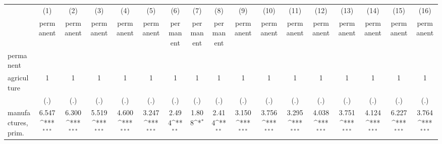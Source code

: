 {
\def\sym#1{\ifmmode^{#1}\else\(^{#1}\)\fi}
\begin{tabular}{l*{16}{c}}
\hline\hline
                    &\multicolumn{1}{c}{(1)}&\multicolumn{1}{c}{(2)}&\multicolumn{1}{c}{(3)}&\multicolumn{1}{c}{(4)}&\multicolumn{1}{c}{(5)}&\multicolumn{1}{c}{(6)}&\multicolumn{1}{c}{(7)}&\multicolumn{1}{c}{(8)}&\multicolumn{1}{c}{(9)}&\multicolumn{1}{c}{(10)}&\multicolumn{1}{c}{(11)}&\multicolumn{1}{c}{(12)}&\multicolumn{1}{c}{(13)}&\multicolumn{1}{c}{(14)}&\multicolumn{1}{c}{(15)}&\multicolumn{1}{c}{(16)}\\
                    &\multicolumn{1}{c}{permanent}&\multicolumn{1}{c}{permanent}&\multicolumn{1}{c}{permanent}&\multicolumn{1}{c}{permanent}&\multicolumn{1}{c}{permanent}&\multicolumn{1}{c}{permanent}&\multicolumn{1}{c}{permanent}&\multicolumn{1}{c}{permanent}&\multicolumn{1}{c}{permanent}&\multicolumn{1}{c}{permanent}&\multicolumn{1}{c}{permanent}&\multicolumn{1}{c}{permanent}&\multicolumn{1}{c}{permanent}&\multicolumn{1}{c}{permanent}&\multicolumn{1}{c}{permanent}&\multicolumn{1}{c}{permanent}\\
\hline
permanent           &                     &                     &                     &                     &                     &                     &                     &                     &                     &                     &                     &                     &                     &                     &                     &                     \\
agriculture         &           1         &           1         &           1         &           1         &           1         &           1         &           1         &           1         &           1         &           1         &           1         &           1         &           1         &           1         &           1         &           1         \\
                    &         (.)         &         (.)         &         (.)         &         (.)         &         (.)         &         (.)         &         (.)         &         (.)         &         (.)         &         (.)         &         (.)         &         (.)         &         (.)         &         (.)         &         (.)         &         (.)         \\
[1em]
manufactures, prim. &       6.547\sym{***}&       6.300\sym{***}&       5.519\sym{***}&       4.600\sym{***}&       3.247\sym{***}&       2.494\sym{**} &       1.808\sym{*}  &       2.414\sym{**} &       3.150\sym{***}&       3.756\sym{***}&       3.295\sym{***}&       4.038\sym{***}&       3.751\sym{***}&       4.124\sym{***}&       6.227\sym{***}&       3.764\sym{***}\\

\end{tabular}}
